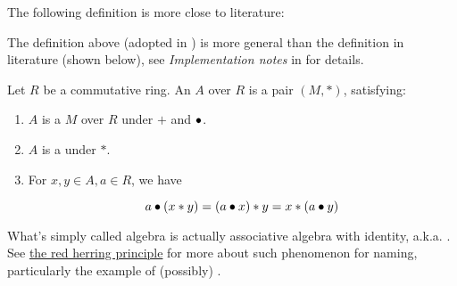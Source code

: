 \begin{remark}
    \label{mk:AlgebraLiterature}

    The following definition is more close to literature:

    The definition above (adopted in \Mathlib) is more general than the definition in literature (shown below),
    see \emph{Implementation notes} in  for details.
    
    Let $R$ be a commutative ring. An  $A$ over $R$ is a pair $(M, *)$, satisfying:

    \begin{enumerate}
    \item $A$ is a  $M$ over $R$ under $+$ and $\bullet$.

    \item $A$ is a  under $*$.

    \item For $x, y \in A, a \in R$, we have
    
    $$
    a \bullet (x * y) = (a \bullet x) * y = x * (a \bullet y)
    $$

    \end{enumerate}
    
\end{remark}

\begin{remark}
    \label{mk:AlgebraName}

    What's simply called algebra is actually associative algebra with identity, a.k.a. . See
    \href{https://ncatlab.org/nlab/show/red%20herring%20principle}{the red herring principle}
    for more about such phenomenon for naming, particularly the example of (possibly) .
    
\end{remark}

